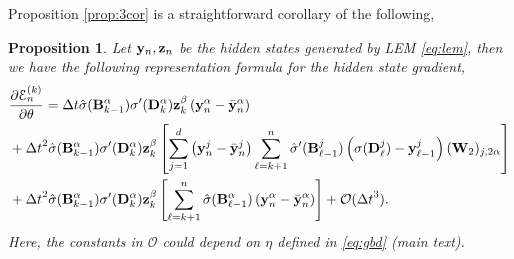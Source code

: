 \documentclass{article} \usepackage{iclr2022_conference,times}
\newcommand{\by}{{\bf y}}
\newcommand{\bz}{{\bf z}}
\newcommand{\bW}{{\bf W}}
\newcommand{\bB}{{\bf B}}
\newcommand{\ord}{{\mathcal O}}
\newcommand{\Dt}{{\Delta t}}
\newcommand{\E}{\EuScript{E}}
\newcommand{\bD}{{\bf D}}
\newtheorem{proposition}[theorem]{Proposition}
\begin{document}
Proposition \ref{prop:3cor} is a straightforward corollary of the following, 
\begin{proposition}
Let $\by_n,\bz_n$ be the hidden states generated by LEM \eqref{eq:lem}, then we have the following representation formula for the hidden state gradient,
\label{prop:3}
\begin{equation}
    \label{eq:glb}
    \begin{aligned}
    &\frac{\partial \E^{(k)}_n}{\partial \theta} = 
    \Dt \hat{\sigma}(\bB^\alpha_{k-1})\sigma^{\prime}(\bD^\alpha_{k})\bz^\beta_{k}\left(\by^{\alpha}_n - \bar{\by}^\alpha_n\right) \\
&+\Dt^2\hat{\sigma}(\bB^\alpha_{k-1})\sigma^{\prime}(\bD^\alpha_{k})\bz^\beta_{k}\left[\sum\limits_{j=1}^d \left(\by_n^{j} - \bar{\by}_n^j\right)\sum\limits_{\ell=k+1}^n\hat{\sigma}^{\prime}(\bB^j_{\ell-1})\left(\sigma(\bD^j_{\ell}) - \by^j_{\ell-1}\right)(\bW_2)_{j,2\alpha}\right] \\
&+\Dt^2\hat{\sigma}(\bB^\alpha_{k-1})\sigma^{\prime}(\bD^\alpha_{k})\bz^\beta_{k}\left[\sum\limits_{\ell=k+1}^n \hat{\sigma}(\bB^{\alpha}_{\ell-1})\left(\by_n^{\alpha} - \bar{\by}_n^{\alpha}\right)\right]    + \ord(\Dt^3). 
    \end{aligned}
\end{equation}
Here, the constants in $\ord$ could depend on $\eta$ defined in \eqref{eq:gbd} (main text).
\end{proposition}
\end{document}

